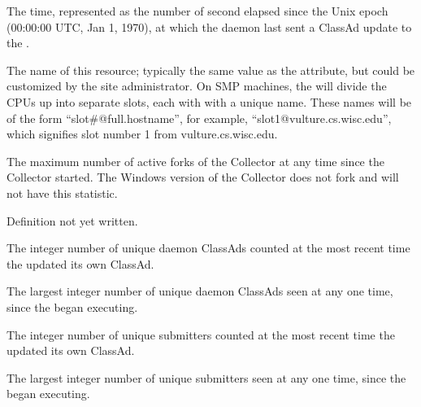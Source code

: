 \begin{description}
\item[\AdAttr{MyCurrentTime}:]  The time, represented as the number of 
  second elapsed since the Unix epoch (00:00:00 UTC, Jan 1, 1970),
  at which the  daemon last sent a ClassAd update to the
  .

\item[\AdAttr{Name}:] The name of this resource; typically the same value as
  the  attribute, but could be customized by the site
  administrator.
  On SMP machines, the  will divide the CPUs up into separate
  slots, each with with a unique name.
  These names will be of the form ``slot\#@full.hostname'', for example,
  ``slot1@vulture.cs.wisc.edu'', which signifies slot number 1 from
  vulture.cs.wisc.edu.

\item[\AdAttr{CondorVersion}:] The maximum number of active forks of the Collector at any time since the Collector started.
The Windows version of the Collector does not fork and will not have this statistic.

\item[\AdAttr{RunningJobs}:] Definition not yet written.

\item[\AdAttr{StartdAds}:] The integer number of unique 
  daemon ClassAds counted at the most recent time the 
  updated its own ClassAd.

\item[\AdAttr{StartdAdsPeak}:] The largest integer number of unique 
   daemon ClassAds seen at any one time, 
  since the  began executing.

\item[\AdAttr{SubmitterAds}:] The integer number of unique submitters 
  counted at the most recent time the  
  updated its own ClassAd.

\item[\AdAttr{SubmitterAdsPeak}:] The largest integer number of unique 
  submitters seen at any one time, 
since the  began executing.


\end{description}
